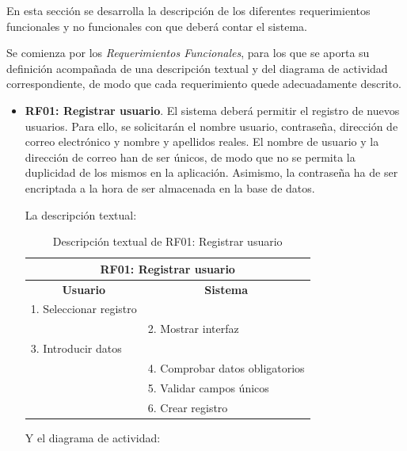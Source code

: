 En esta sección se desarrolla la descripción de los diferentes requerimientos funcionales y no funcionales con que deberá contar el sistema. 

Se comienza por los \emph{Requerimientos Funcionales}, para los que se aporta su definición acompañada de una descripción textual y del diagrama de actividad correspondiente, de modo que cada requerimiento quede adecuadamente descrito.

\begin{itemize}
	\item \textbf{RF01: Registrar usuario}. El sistema deberá permitir el registro de nuevos usuarios. Para ello, se solicitarán el nombre usuario, contraseña, dirección de correo electrónico y nombre y apellidos reales. El nombre de usuario y la dirección de correo han de ser únicos, de modo que no se permita la duplicidad de los mismos en la aplicación. Asimismo, la contraseña ha de ser encriptada a la hora de ser almacenada en la base de datos.
	
	La descripción textual:
	
	\begin{table}[h]
		\centering	
		\begin{tabular}{|l|l|}
			\hline
			\multicolumn{2}{|c|}{\textbf{RF01: Registrar usuario}} \\ \hline
			\multicolumn{1}{|c|}{\textbf{Usuario}} & \multicolumn{1}{c|}{\textbf{Sistema}} \\ \hline
			1. Seleccionar registro &\\ \hline
			& 2. Mostrar interfaz \\ \hline
			3. Introducir datos &\\ \hline
			& 4. Comprobar datos obligatorios \\ \hline
			& 5. Validar campos únicos\\ \hline
			& 6. Crear registro \\ \hline
		\end{tabular}
		\caption{Descripción textual de RF01: Registrar usuario}
		\label{tab:tablaDescTextualRF01}
	\end{table}
	
	\FloatBarrier
	Y el diagrama de actividad:
		

\end{itemize}

